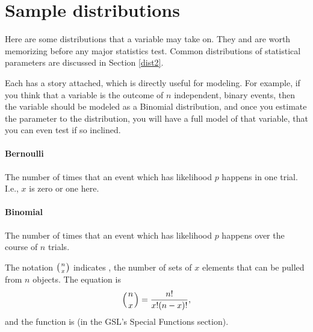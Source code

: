 \section{Sample distributions}
\label{distlist}


Here are some distributions that a variable may take on. They and are
worth memorizing before any major statistics test. Common distributions
of statistical parameters are discussed in Section \ref{dist2}.

Each has a story attached, which is directly useful for
modeling. For example, if you think that a variable is the outcome of $n$
independent, binary events, then the variable should be modeled as a
Binomial distribution, and once you estimate the parameter to the
distribution, you will have a full model of that variable, that you can
even test if so inclined.

\paragraph{Bernoulli}

The number of times that an event which has likelihood $p$ happens in
one trial. I.e., $x$ is zero or one here.


\paragraph{Binomial}

The number of times that an event which has likelihood $p$ happens over the
course of $n$ trials.

The notation $\left({n\atop x}\right)$ indicates
, the number of sets of $x$ elements that can be
pulled from $n$ objects. The equation is $$\left({n\atop x}\right) =
{n!\over x!(n-x)!},$$ and the function is  
(in the GSL's Special Functions section).
 


